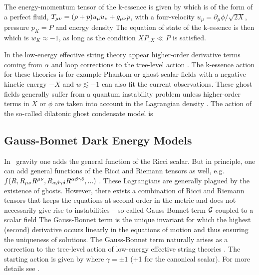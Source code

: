 The energy-momentum tensor of the k-essence is given by
which is of the form of a perfect fluid, $T_{\mu\nu}=(\rho+p)u_\mu u_\nu+g_{\mu\nu} p$, with a four-velocity $u_\mu=\partial_\mu\phi/\sqrt{2X}$, pressure $p_K=P$ and energy density
The equation of state of the k-essence is then
which is $w_K\approx-1$, as long as the condition $XP_{,X}\ll P$ is satisfied.

In the low-energy effective string theory appear higher-order derivative terms coming from $\alpha$ and loop corrections to the tree-level action \parencite{2003PhR...373....1G}. The k-essence action for these theories is for example
Phantom or ghost scalar fields with a negative kinetic energy $-X$ and $w\lesssim-1$ can also fit the current observations. These ghost fields generally suffer from a quantum instability problem unless higher-order terms in $X$ or $\phi$ are taken into account in the Lagrangian density \parencite{2010deto.book.....A}. The action of the so-called dilatonic ghost condensate model is \parencite{2004JCAP...07..004P}
\subsection{Gauss-Bonnet Dark Energy Models}
In \fR\ gravity one adds the general function of the Ricci scalar. But in principle, one can add general functions of the Ricci and Riemann tensors as well, e.g. $f(R,R_{\mu\nu} R^{\mu\nu},R_{\alpha\beta\gamma\delta}R^{\alpha\beta\gamma\delta},...)$ \parencite{2005PhRvD..71f3513C}. These Lagrangians are generally plagued by the existence of ghosts.  However, there exists a combination of Ricci and Riemann tensors that keeps the equations at second-order in the metric and does not necessarily give rise to instabilities -- so-called Gauss-Bonnet term $\mathcal{G}$ coupled to a scalar field
The Gauss-Bonnet term is the unique invariant for which the highest (second) derivative occurs linearly in the equations of motion and thus ensuring the uniqueness of solutions. The Gauss-Bonnet term naturally arises as a correction to the tree-level action of low-energy effective string theories \parencite{2000PhR...337..343L}. The starting action is given by
where $\gamma=\pm1$ (+1 for the canonical scalar). For more details see \textcite{2005PhRvD..71l3509N,2006JCAP...06..004N,2013PhRvD..87h4037C}.
